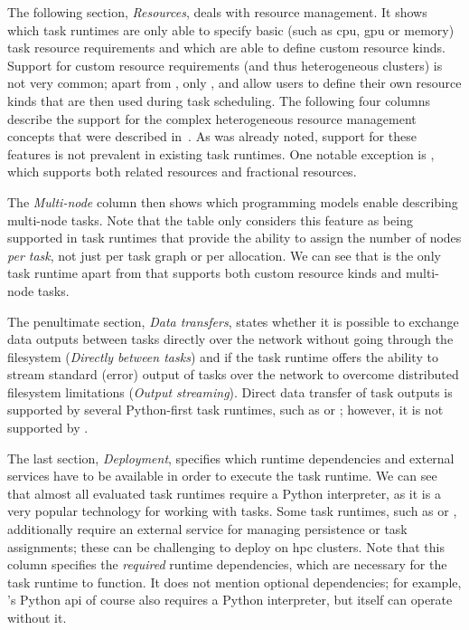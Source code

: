 The following section, \emph{Resources}, deals with resource management. It shows which task
runtimes are only able to specify basic (such as \gls{cpu}, \gls{gpu}
or memory) task resource requirements and which are able to define custom resource kinds. Support
for custom resource requirements (and thus heterogeneous clusters) is not very common; apart from
\hyperqueue{}, only \dask{}, \ray{} and
\snakemake{} allow users to define their own resource kinds that are then used during
task scheduling. The following four columns describe the support for the complex heterogeneous
resource management concepts that were described in~. As was already noted,
support for these features is not prevalent in existing task runtimes. One notable exception is
\ray{}, which supports both related resources and fractional resources.

The \emph{Multi-node} column then shows which programming models enable describing multi-node
tasks. Note that the table only considers this feature as being supported in task runtimes that
provide the ability to assign the number of nodes \emph{per task}, not just per task graph
or per allocation. We can see that \snakemake{} is the only task runtime apart from
\hyperqueue{} that supports both custom resource kinds and multi-node tasks.

The penultimate section, \emph{Data transfers}, states whether it is possible to exchange data
outputs between tasks directly over the network without going through the filesystem
(\emph{Directly between tasks}) and if the task runtime offers the ability to stream standard (error)
output of tasks over the network to overcome distributed filesystem limitations
(\emph{Output streaming}). Direct data transfer of task outputs is supported by several
Python-first task runtimes, such as \dask{} or \ray{}; however, it
is not supported by \hyperqueue{}.

The last section, \emph{Deployment}, specifies which runtime dependencies and external
services have to be available in order to execute the task runtime. We can see that almost all
evaluated task runtimes require a Python interpreter, as it is a very popular technology for
working with tasks. Some task runtimes, such as \merlin{} or \fireworks{},
additionally require an external service for managing persistence or task assignments; these can be
challenging to deploy on \gls{hpc} clusters. Note that this column specifies the
\emph{required} runtime dependencies, which are necessary for the task runtime to function.
It does not mention optional dependencies; for example, \hyperqueue{}'s Python
\gls{api} of course also requires a Python interpreter, but \hyperqueue{}
itself can operate without it.

